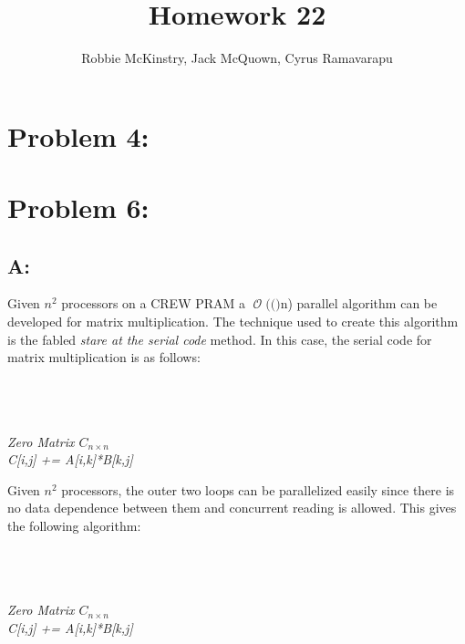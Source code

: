 \documentclass[12pt]{article}
\newcommand{\BigO}[1]{\ensuremath{\operatorname{\mathcal{O}}\bigl(#1\bigr)}}
\begin{document}
\title{Homework 22}
\author{Robbie McKinstry, Jack McQuown, Cyrus Ramavarapu}
\renewcommand{\today}{24 October 2016}
\renewcommand{\baselinestretch}{1.5}
\maketitle

\section*{Problem 4: }
\section*{Problem 6: }
\subsection*{A:}
Given $n^2$ processors on a CREW PRAM a \BigO(n) parallel algorithm
can be developed for matrix multiplication.  The technique used to 
create this algorithm is the fabled \textit{stare at the serial code}
method.  In this case, the serial code for matrix multiplication is as
follows:\\\\
\begin{algorithm}[H]
\\
\\
\textit{Zero Matrix $C_{n\times n}$}\\
{
{
{\textit{C[i,j] += A[i,k]*B[k,j]}}
}
}
\end{algorithm}
Given $n^2$ processors, the outer two loops can be parallelized easily
since there is no data dependence between them and concurrent reading
is allowed.  This gives the following algorithm:\\\\
\begin{algorithm}[H]
\\
\\
\textit{Zero Matrix $C_{n\times n}$}\\
{
{
{\textit{C[i,j] += A[i,k]*B[k,j]}}
}
}
\end{algorithm}
\end{document}
